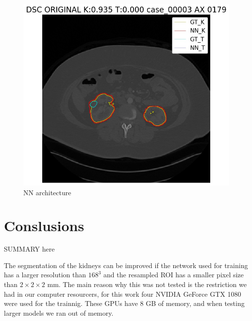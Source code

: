 \documentclass{article}
\begin{document}
\begin{figure}[h]
    \includegraphics[totalheight=.20\textheight]{imgs/ex4.jpg}
    \caption{NN architecture }
    \label{fig:res1}
\end{figure}



\section{Conslusions}
\label{sec:conlusions}
SUMMARY here

The segmentation of the kidneys can be improved if the network used for training has a larger resolution than $168^3$
and the resampled ROI has a smaller pixel size than $2 \times 2 \times 2$ mm. The main reason why this was not tested
is the restriction we had in our computer resourcers, for this work four NVIDIA GeForce GTX 1080 were used for the trainnig.
These GPUs have 8 GB of memory, and when testing larger models we ran out of memory. 
\end{document}
